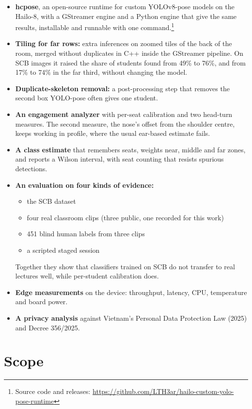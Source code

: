 \begin{itemize}
\tightlist
\item
  \textbf{hcpose}, an open-source runtime for custom YOLOv8-pose models on the Hailo-8, with a GStreamer engine and a Python engine that give the same results, installable and runnable with one command.\footnote{Source code and releases: \url{https://github.com/LTH3ar/hailo-custom-yolo-pose-runtime}}
\item
  \textbf{Tiling for far rows:} extra inferences on zoomed tiles of the back of the room, merged without duplicates in C++ inside the GStreamer pipeline. On SCB images it raised the share of students found from 49\% to 76\%, and from 17\% to 74\% in the far third, without changing the model.
\item
  \textbf{Duplicate-skeleton removal:} a post-processing step that removes the second box YOLO-pose often gives one student.
\item
  \textbf{An engagement analyzer} with per-seat calibration and two head-turn measures. The second measure, the nose's offset from the shoulder centre, keeps working in profile, where the usual ear-based estimate fails.
\item
  \textbf{A class estimate} that remembers seats, weights near, middle and far zones, and reports a Wilson interval, with seat counting that resists spurious detections.
\item
  \textbf{An evaluation on four kinds of evidence:}

  \begin{itemize}
  \tightlist
  \item
    the SCB dataset
  \item
    four real classroom clips (three public, one recorded for this work)
  \item
    451 blind human labels from three clips
  \item
    a scripted staged session
  \end{itemize}

  Together they show that classifiers trained on SCB do not transfer to real lectures well, while per-student calibration does.
\item
  \textbf{Edge measurements} on the device: throughput, latency, CPU, temperature and board power.
\item
  \textbf{A privacy analysis} against Vietnam's Personal Data Protection Law (2025) and Decree 356/2025.
\end{itemize}

\section{Scope}

